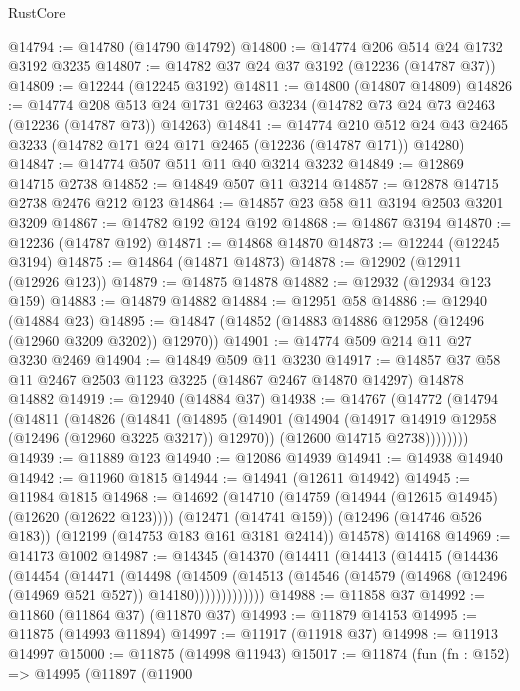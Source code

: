 \begin{lexlean}{RustCore}
\begin{coremodule}
@14794 := @14780 (@14790 @14792)
@14800 := @14774 @206 @514 @24 @1732 @3192 @3235
@14807 := @14782 @37 @24 @37 @3192 (@12236 (@14787 @37))
@14809 := @12244 (@12245 @3192)
@14811 := @14800 (@14807 @14809)
@14826 := @14774
    @208
    @513
    @24
    @1731
    @2463
    @3234
    (@14782 @73 @24 @73 @2463 (@12236 (@14787 @73)) @14263)
@14841 := @14774
    @210
    @512
    @24
    @43
    @2465
    @3233
    (@14782 @171 @24 @171 @2465 (@12236 (@14787 @171)) @14280)
@14847 := @14774 @507 @511 @11 @40 @3214 @3232
@14849 := @12869 @14715 @2738
@14852 := @14849 @507 @11 @3214
@14857 := @12878 @14715 @2738 @2476 @212 @123
@14864 := @14857 @23 @58 @11 @3194 @2503 @3201 @3209
@14867 := @14782 @192 @124 @192
@14868 := @14867 @3194
@14870 := @12236 (@14787 @192)
@14871 := @14868 @14870
@14873 := @12244 (@12245 @3194)
@14875 := @14864 (@14871 @14873)
@14878 := @12902 (@12911 (@12926 @123))
@14879 := @14875 @14878
@14882 := @12932 (@12934 @123 @159)
@14883 := @14879 @14882
@14884 := @12951 @58
@14886 := @12940 (@14884 @23)
@14895 := @14847 (@14852 (@14883 @14886 @12958 (@12496 (@12960 @3209 @3202)) @12970))
@14901 := @14774 @509 @214 @11 @27 @3230 @2469
@14904 := @14849 @509 @11 @3230
@14917 := @14857 @37 @58 @11 @2467 @2503 @1123 @3225 (@14867 @2467 @14870 @14297) @14878 @14882
@14919 := @12940 (@14884 @37)
@14938 := @14767
    (@14772
      (@14794
        (@14811
          (@14826
            (@14841
              (@14895
                (@14901
                  (@14904 (@14917 @14919 @12958 (@12496 (@12960 @3225 @3217)) @12970))
                  (@12600 @14715 @2738))))))))
@14939 := @11889 @123
@14940 := @12086 @14939
@14941 := @14938 @14940
@14942 := @11960 @1815
@14944 := @14941 (@12611 @14942)
@14945 := @11984 @1815
@14968 := @14692
    (@14710
      (@14759 (@14944 (@12615 @14945) (@12620 (@12622 @123))))
      (@12471 (@14741 @159))
      (@12496 (@14746 @526 @183))
      (@12199 (@14753 @183 @161 @3181 @2414))
      @14578)
    @14168
@14969 := @14173 @1002
@14987 := @14345
    (@14370
      (@14411
        (@14413
          (@14415
            (@14436
              (@14454
                (@14471
                  (@14498
                    (@14509
                      (@14513
                        (@14546 (@14579 (@14968 (@12496 (@14969 @521 @527)) @14180)))))))))))))
@14988 := @11858 @37
@14992 := @11860 (@11864 @37) (@11870 @37)
@14993 := @11879 @14153
@14995 := @11875 (@14993 @11894)
@14997 := @11917 (@11918 @37)
@14998 := @11913 @14997
@15000 := @11875 (@14998 @11943)
@15017 := @11874
    (fun (fn : @152) =>
    @14995
      (@11897
        (@11900

\end{coremodule}
\end{lexlean}

